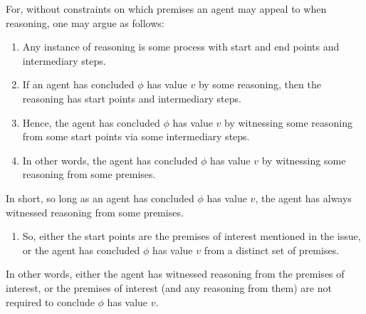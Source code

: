 \begin{note}
  For, without constraints on which premises an agent may appeal to when reasoning, one may argue as follows:
  \begin{enumerate}
  \item Any instance of reasoning is some process with start and end points and intermediary steps.
  \item If an agent has concluded \(\phi\) has value \(v\) by some reasoning, then the reasoning has start points and intermediary steps.
  \item Hence, the agent has concluded \(\phi\) has value \(v\) by witnessing some reasoning from some start points via some intermediary steps.
  \item In other words, the agent has concluded \(\phi\) has value \(v\) by witnessing some reasoning from some premises.
  \end{enumerate}

  In short, so long as an agent has concluded \(\phi\) has value \(v\), the agent has always witnessed reasoning from some premises.

  \begin{enumerate}[resume]
  \item So, either the start points are the premises of interest mentioned in the issue, or the agent has concluded \(\phi\) has value \(v\) from a distinct set of premises.
  \end{enumerate}

  In other words, either the agent has witnessed reasoning from the premises of interest, or the premises of interest (and any reasoning from them) are not required to conclude \(\phi\) has value \(v\).
\end{note}

